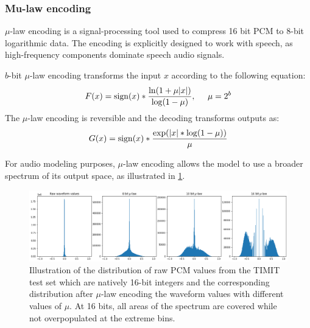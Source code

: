 \subsubsection{Mu-law encoding}
$\mu$-law encoding is a signal-processing tool used to compress 16 bit PCM to 8-bit logarithmic data.
The encoding is explicitly designed to work with speech, as high-frequency components dominate speech audio signals. \cite{noauthor_-law_2008}

$b$-bit $\mu$-law encoding transforms the input $x$ according to the following equation:
\begin{equation}
    F(x) = \operatorname{sign}(x) * \frac{\ln(1 + \mu |x|)}{\log (1-\mu)}, \hspace{.5cm} \mu = 2^b
\end{equation}
The $\mu$-law encoding is reversible and the decoding transforms outputs as:
\begin{equation}
G(x) = \operatorname{sign}(x)*\frac{\exp(|x|*\log (1-\mu))}{\mu}
\end{equation}

For audio modeling purposes, $\mu$-law encoding allows the model to use a broader spectrum of its output space, as illustrated in \cref{fig:mu-law-enc}.
\cite{oord_wavenet_2016}


\begin{figure}[ht]
    \centering
    \includegraphics[width=\columnwidth]{mu_law.png}
    \caption{
    Illustration of the distribution of raw PCM values from the TIMIT test set which are natively 16-bit integers and the corresponding distribution after $\mu$-law encoding the waveform values with different values of $\mu$.
    At 16 bits, all areas of the spectrum are covered while not overpopulated at the extreme bins.
    }
    \label{fig:mu-law-enc}
\end{figure}



